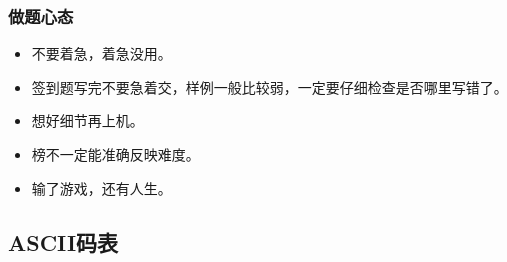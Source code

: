 \documentclass[a4paper, twoside]{article}
\begin{document}
    \subsubsection{做题心态}
    \begin{itemize}
        \item 不要着急，着急没用。
        \item 签到题写完不要急着交，样例一般比较弱，一定要仔细检查是否哪里写错了。
        \item 想好细节再上机。
        \item 榜不一定能准确反映难度。
        \item 输了游戏，还有人生。
    \end{itemize}

\newpage
\subsection{ASCII码表}
\end{document}

